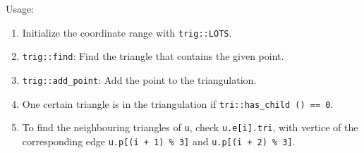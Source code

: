 Usage:
\begin{enumerate}
\item Initialize the coordinate range with \texttt{trig::LOTS}.
\item \texttt{trig::find}: Find the triangle that contains the given point.
\item \texttt{trig::add\_point}: Add the point to the triangulation.
\item One certain triangle is in the triangulation if \texttt{tri::has\_child () == 0}.
\item To find the neighbouring triangles of \texttt{u}, check \texttt{u.e[i].tri}, with vertice of the corresponding edge \texttt{u.p[(i + 1) \% 3]} and \texttt{u.p[(i + 2) \% 3]}.
\end{enumerate}

